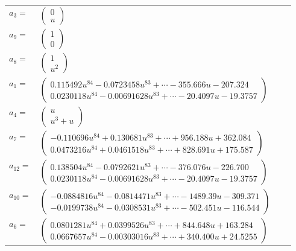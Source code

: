 \documentclass[1p]{elsarticle_modified}
\theoremstyle{definition}
\begin{document}
\begin{tabular}{m{7pt} m{180pt} m{7pt} m{180pt} }
\flushright $a_{3}=$&$\begin{pmatrix}0\\u\end{pmatrix}$ \\
\flushright $a_{9}=$&$\begin{pmatrix}1\\0\end{pmatrix}$ \\
\flushright $a_{8}=$&$\begin{pmatrix}1\\u^2\end{pmatrix}$ \\
\flushright $a_{1}=$&$\begin{pmatrix}0.115492 u^{84}-0.0723458 u^{83}+\cdots-355.666 u-207.324\\0.0230118 u^{84}-0.00691628 u^{83}+\cdots-20.4097 u-19.3757\end{pmatrix}$ \\
\flushright $a_{4}=$&$\begin{pmatrix}u\\u^3+u\end{pmatrix}$ \\
\flushright $a_{7}=$&$\begin{pmatrix}-0.110696 u^{84}+0.130681 u^{83}+\cdots+956.188 u+362.084\\0.0473216 u^{84}+0.0461518 u^{83}+\cdots+828.691 u+175.587\end{pmatrix}$ \\
\flushright $a_{12}=$&$\begin{pmatrix}0.138504 u^{84}-0.0792621 u^{83}+\cdots-376.076 u-226.700\\0.0230118 u^{84}-0.00691628 u^{83}+\cdots-20.4097 u-19.3757\end{pmatrix}$ \\
\flushright $a_{10}=$&$\begin{pmatrix}-0.0884816 u^{84}-0.0814471 u^{83}+\cdots-1489.39 u-309.371\\-0.0199738 u^{84}-0.0308531 u^{83}+\cdots-502.451 u-116.544\end{pmatrix}$ \\
\flushright $a_{6}=$&$\begin{pmatrix}0.0801281 u^{84}+0.0399526 u^{83}+\cdots+844.648 u+163.284\\0.0667657 u^{84}-0.00303016 u^{83}+\cdots+340.400 u+24.5255\end{pmatrix}$ \\

\end{tabular}
\end{document}
